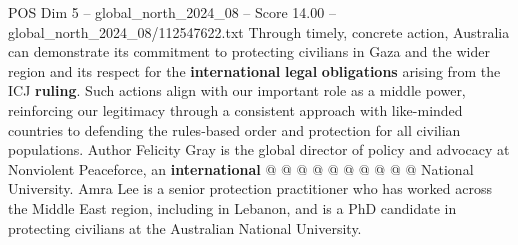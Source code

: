 \begin{textsample}{POS Dim 5 – global\_north\_2024\_08 – Score 14.00 – global\_north\_2024\_08/112547622.txt}
Through timely, concrete action, Australia can demonstrate its commitment to protecting civilians in Gaza and the wider region and its respect for the \textbf{international} \textbf{legal} \textbf{obligations} arising from the ICJ \textbf{ruling}.
Such actions align with our important role as a middle power, reinforcing our legitimacy through a consistent approach with like-minded countries to defending the rules-based order and protection for all civilian populations.
Author Felicity Gray is the global director of policy and advocacy at Nonviolent Peaceforce, an \textbf{international} @ @ @ @ @ @ @ @ @ @ National University.
Amra Lee is a senior protection practitioner who has worked across the Middle East region, including in Lebanon, and is a PhD candidate in protecting civilians at the Australian National University.

\end{textsample}
